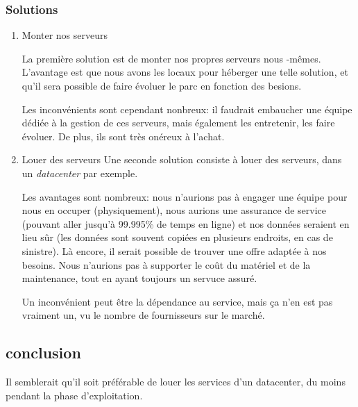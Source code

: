     \subsubsection{Solutions}
        \begin{enumerate}
            \item Monter nos serveurs
            
            La première solution est de monter nos propres serveurs nous
-mêmes.
            L'avantage est que nous avons les locaux pour héberger une telle solution, et qu'il sera possible de faire évoluer le parc en fonction des besions.
    
            Les inconvénients sont cependant nonbreux: il faudrait embaucher une équipe dédiée à la gestion de ces serveurs, mais également les entretenir,
            les faire évoluer. De plus, ils sont très onéreux à l'achat.

            \item Louer des serveurs
            Une seconde solution consiste à louer des serveurs, dans un \textsl{datacenter} par exemple.

            Les avantages sont nombreux: nous n'aurions pas à engager une équipe pour
            nous en occuper (physiquement), nous aurions une assurance de service
            (pouvant aller jusqu'à 99.995\% de temps en ligne) et nos données seraient
            en lieu sûr (les données sont souvent copiées en plusieurs endroits, en cas de sinistre). Là encore, il serait possible de trouver une offre adaptée à nos besoins. Nous n'aurions pas à supporter le coût du matériel et de la maintenance, tout en ayant toujours un servuce assuré.

            Un inconvénient peut être la dépendance au service, mais ça n'en est pas vraiment un, vu le nombre de fournisseurs sur le marché.
        \end{enumerate}
    \subsection{conclusion}
    Il semblerait qu'il soit préférable de louer les services d'un datacenter, du moins pendant la phase d'exploitation.
%

\vfill
\pagebreak
